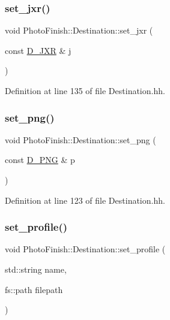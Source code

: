 \subsubsection{\texorpdfstring{set\+\_\+jxr()}{set\_jxr()}}
{\footnotesize\ttfamily void Photo\+Finish\+::\+Destination\+::set\+\_\+jxr (\begin{DoxyParamCaption}\item[{const \hyperlink{class_photo_finish_1_1_d___j_x_r}{D\+\_\+\+J\+XR} \&}]{j }\end{DoxyParamCaption})\hspace{0.3cm}{\ttfamily [inline]}}



Definition at line 135 of file Destination.\+hh.

\mbox{\label{class_photo_finish_1_1_destination_a9411b9217ea9ad77dee22876da5dfa7d}} 
\subsubsection{\texorpdfstring{set\+\_\+png()}{set\_png()}}
{\footnotesize\ttfamily void Photo\+Finish\+::\+Destination\+::set\+\_\+png (\begin{DoxyParamCaption}\item[{const \hyperlink{class_photo_finish_1_1_d___p_n_g}{D\+\_\+\+P\+NG} \&}]{p }\end{DoxyParamCaption})\hspace{0.3cm}{\ttfamily [inline]}}



Definition at line 123 of file Destination.\+hh.

\mbox{\label{class_photo_finish_1_1_destination_aa49fdb6a14357035eaefa7d37134a173}} 
\subsubsection{\texorpdfstring{set\+\_\+profile()}{set\_profile()}\hspace{0.1cm}{\footnotesize\ttfamily [1/2]}}
{\footnotesize\ttfamily void Photo\+Finish\+::\+Destination\+::set\+\_\+profile (\begin{DoxyParamCaption}\item[{std\+::string}]{name,  }\item[{fs\+::path}]{filepath }\end{DoxyParamCaption})\hspace{0.3cm}{\ttfamily [inline]}}




